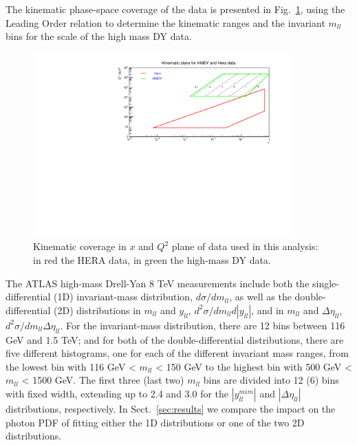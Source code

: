 The kinematic phase-space coverage of the data is presented in Fig.~\ref{fig:data}, using the Leading Order relation to determine the kinematic ranges and
the invariant $m_{ll}$ bins for the scale of the high mass DY data.
\begin{figure}[t]
  \begin{center}
    \includegraphics[width=10cm]{figs/kin2.pdf}
    \end{center}
    \caption{Kinematic coverage in $x$ and $Q^2$ plane of data used in this analysis: in red the HERA data, in green the high-mass DY data.}
\label{fig:data}
\end{figure}
The ATLAS high-mass Drell-Yan 8 TeV measurements include both the
single-differential (1D) invariant-mass distribution,
$d\sigma/dm_{ll}$, as well as the double-differential (2D)
distributions in $m_{ll}$ and $y_{ll}$,
$d^{2}\sigma/dm_{ll}d|y_{ll}|$, and in $m_{ll}$ and $\Delta\eta_{ll}$,
$d^{2}\sigma/dm_{ll}\Delta\eta_{ll}$.
%
For the invariant-mass distribution, there are 12 bins between 116 GeV
and 1.5 TeV; and for both of the double-differential distributions,
there are five different histograms, one for each of the different
invariant mass ranges, from the lowest bin with 116 GeV < $m_{ll}$ <
150 GeV to the highest bin with 500 GeV < $m_{ll}$ < 1500 GeV.
The first three (last two) $m_{ll}$ bins are divided into 12 (6) bins
with fixed width, extending up to 2.4 and 3.0 for the $|y_{ll}^{mim}|$
and $|\Delta\eta_{ll}|$ distributions, respectively.
%
In Sect.~\ref{sec:results} we compare the impact on the photon PDF of
fitting either the 1D distributions or one of the two 2D
distributions.

